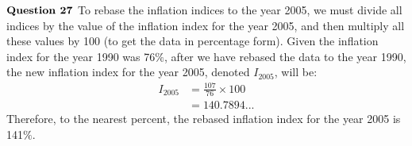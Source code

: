\documentclass{article}
\begin{document}
$\textbf{Question 27} \\$
To rebase the inflation indices to the year 2005, we must divide all indices by the value of the inflation index for the year 2005, and then multiply all these values by 100 (to get the data in percentage form). Given the inflation index for the year 1990 was 76$\%$, after we have rebased the data to the year 1990, the new inflation index for the year 2005, denoted $I_{2005}$, will be:
\begin{align*}
I_{2005} &= \frac{107}{76} \times 100\\
&= 140.7894...
\end{align*}
Therefore, to the nearest percent, the rebased inflation index for the year 2005 is 141$\%$.
\end{document}
